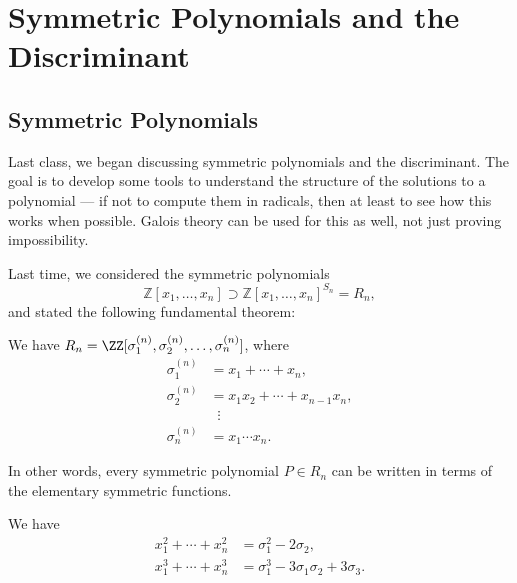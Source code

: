 

\section{Symmetric Polynomials and the Discriminant}

\subsection{Symmetric Polynomials}

Last class, we began discussing symmetric polynomials and the discriminant. The goal is to develop some tools to understand the structure of the solutions to a polynomial --- if not to compute them in radicals, then at least to see how this works when possible. Galois theory can be used for this as well, not just proving impossibility. 

Last time, we considered the symmetric polynomials \[\mathbb{Z}[x_1, \ldots, x_n] \supset \mathbb{Z}[x_1, \ldots, x_n]^{S_n} = R_n,\] and stated the following fundamental theorem:

\begin{theorem} \label{fundamental thm of sym poly}
    We have $R_n = \ZZ[\sigma_1^{(n)}, \sigma_2^{(n)}, \ldots, \sigma_n^{(n)}]$, where \begin{align*}
        \sigma_1^{(n)} &= x_1 + \cdots + x_n, \\
        \sigma_2^{(n)} &= x_1x_2 + \cdots + x_{n - 1}x_n, \\
        &\;\; \vdots \\
        \sigma_n^{(n)} &= x_1\cdots x_n.
    \end{align*}
\end{theorem}

In other words, every symmetric polynomial $P \in R_n$ can be written in terms of the elementary symmetric functions. 

\begin{example} \label{power sums example}
    We have 
    \begin{align*}
        x_1^2 + \cdots + x_n^2 &= \sigma_1^2 - 2\sigma_2, \\
        x_1^3 + \cdots + x_n^3 &= \sigma_1^3 - 3\sigma_1\sigma_2 + 3\sigma_3. 
    \end{align*}
\end{example}


